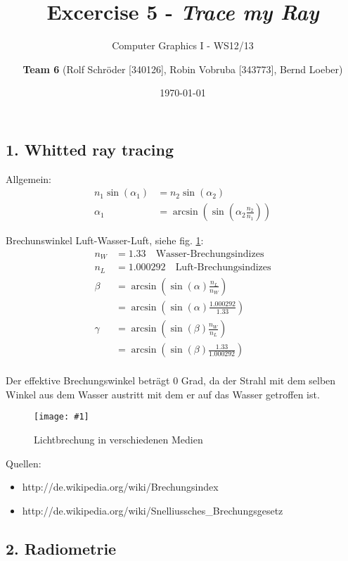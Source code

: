 \documentclass[a4paper,headings=small]{scrartcl}
\title{Excercise 5 - \emph{Trace my Ray}}
\subtitle{Computer Graphics I - WS12/13}
\author{\textbf{Team 6} (Rolf Schröder [340126], Robin Vobruba [343773], Bernd Loeber)}
\date{\today}
\numberwithin{equation}{section} %
\numberwithin{figure}{section}   %
\newcommand{\image}[3]{
	\begin{figure}[htbp]
		\centering
		\texttt{[image: \#1]}
		\caption{#3}
		\label{fig:#1}
	\end{figure}
}
\begin{document}
\maketitle

\subsection*{1. Whitted ray tracing}

Allgemein:
\begin{align*}
n_1 \sin(\alpha_1) &= n_2 \sin(\alpha_2) \\
\alpha_1 &= \arcsin(\sin(\alpha_2 \frac{n_2}{n_1}))
\end{align*}

Brechunswinkel Luft-Wasser-Luft, siehe fig. \ref{fig:img/brechungswinkel}:
\begin{align*}
n_W &= 1.33 \quad \text{Wasser-Brechungsindizes} \\
n_L &= 1.000292 \quad \text{Luft-Brechungsindizes} \\
\beta
	&= \arcsin(\sin(\alpha) \frac{n_L}{n_W}) \\
	&= \arcsin(\sin(\alpha) \frac{1.000292}{1.33}) \\
\gamma
	&= \arcsin(\sin(\beta) \frac{n_W}{n_L}) \\
	&= \arcsin(\sin(\beta) \frac{1.33}{1.000292}) \\
\end{align*}

Der effektive Brechungswinkel beträgt 0 Grad, da der Strahl mit dem selben Winkel aus dem Wasser austritt mit dem er auf das Wasser getroffen ist.

\image{img/brechungswinkel}{0.8}{Lichtbrechung in verschiedenen Medien}

Quellen:
\begin{itemize}
\item http://de.wikipedia.org/wiki/Brechungsindex
\item http://de.wikipedia.org/wiki/Snelliussches\_Brechungsgesetz
\end{itemize}


\subsection*{2. Radiometrie}
\end{document}
